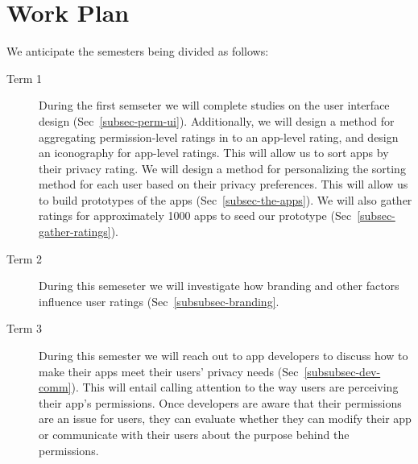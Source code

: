 \documentclass[11pt]{article}
\begin{document}
\section{Work Plan}

We anticipate the semesters being divided as
follows:
\begin{description}

\item[Term 1]
During the first semseter we will complete studies on the user interface design
(Sec~\ref{subsec-perm-ui}). Additionally, we will design a method for aggregating 
permission-level ratings in to an app-level rating, and design an iconography
for app-level ratings. This will allow us to sort apps by their privacy rating.
We will design a method for personalizing the sorting method for each user
based on their privacy preferences.
This will allow us to build prototypes of the 
apps (Sec~\ref{subsec-the-apps}). We will also gather ratings for 
approximately 1000 apps to seed our prototype (Sec~\ref{subsec-gather-ratings}).

\item[Term 2]
During this semeseter we will investigate how branding and other factors
influence user ratings (Sec~\ref{subsubsec-branding}.

\item[Term 3] 
During this semester we will reach out to app developers to discuss
how to make their apps meet their users' privacy needs 
(Sec~\ref{subsubsec-dev-comm}). This will entail
calling attention to the way users are perceiving their app's
permissions. Once developers are aware that their permissions are an
issue for users, they can evaluate whether they can modify their app
or communicate with their users about the purpose behind the
permissions.


\end{description}

\singlespacing
\end{document}
